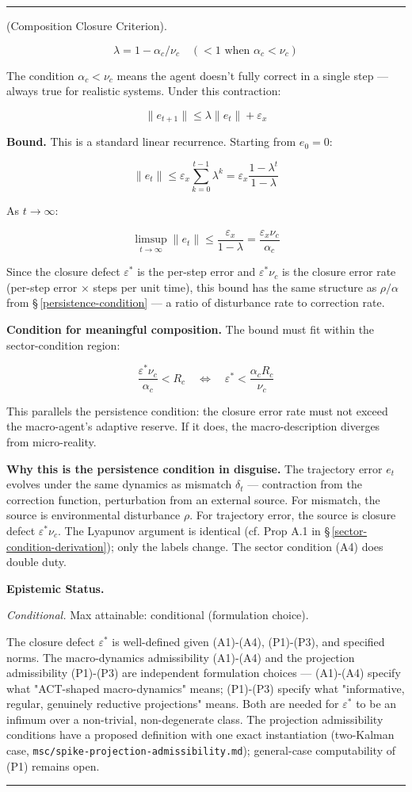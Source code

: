 \documentclass[11pt,oneside]{article}
\newcounter{claim}[section]
\renewcommand{\theclaim}{\thesection.\arabic{claim}}
\newenvironment{segment}[2]{%
  \refstepcounter{claim}%
  \bigskip\noindent\hrule\smallskip
  \noindent{\bfseries #1~\theclaim}\enskip(#2).\par\smallskip
  \noindent\ignorespaces
}{%
  \par\smallskip\noindent\hrule\bigskip
}
\newenvironment{formulation}[1][]{\begin{segment}{Formulation}{#1}}{\end{segment}}
\begin{document}
\begin{formulation}[Composition Closure Criterion]
$$\lambda = 1 - \alpha_c / \nu_c \quad (< 1 \text{ when } \alpha_c < \nu_c)$$

The condition $\alpha_c < \nu_c$ means the agent doesn't fully correct in a single step — always true for realistic systems. Under this contraction:

$$\lVert e_{t+1} \rVert \leq \lambda \lVert e_t \rVert + \varepsilon_x$$

\textbf{Bound.} This is a standard linear recurrence. Starting from $e_0 = 0$:

$$\lVert e_t \rVert \leq \varepsilon_x \sum_{k=0}^{t-1} \lambda^k = \varepsilon_x \frac{1 - \lambda^t}{1 - \lambda}$$

As $t \to \infty$:

$$\limsup_{t \to \infty} \lVert e_t \rVert \leq \frac{\varepsilon_x}{1 - \lambda} = \frac{\varepsilon_x \nu_c}{\alpha_c}$$

Since the closure defect $\varepsilon^*$ is the per-step error and $\varepsilon^* \nu_c$ is the closure error rate (per-step error × steps per unit time), this bound has the same structure as $\rho / \alpha$ from \S\,\ref{persistence-condition} — a ratio of disturbance rate to correction rate.

\textbf{Condition for meaningful composition.} The bound must fit within the sector-condition region:

$$\frac{\varepsilon^* \nu_c}{\alpha_c} < R_c \quad \Longleftrightarrow \quad \varepsilon^* < \frac{\alpha_c R_c}{\nu_c}$$

This parallels the persistence condition: the closure error rate must not exceed the macro-agent's adaptive reserve. If it does, the macro-description diverges from micro-reality.

\textbf{Why this is the persistence condition in disguise.} The trajectory error $e_t$ evolves under the same dynamics as mismatch $\delta_t$ — contraction from the correction function, perturbation from an external source. For mismatch, the source is environmental disturbance $\rho$. For trajectory error, the source is closure defect $\varepsilon^* \nu_c$. The Lyapunov argument is identical (cf. Prop A.1 in \S\,\ref{sector-condition-derivation}); only the labels change. The sector condition (A4) does double duty.


\medskip\noindent\textbf{Epistemic Status.}


\textit{Conditional.} Max attainable: conditional (formulation choice).

The closure defect $\varepsilon^*$ is well-defined given (A1)-(A4), (P1)-(P3), and specified norms. The macro-dynamics admissibility (A1)-(A4) and the projection admissibility (P1)-(P3) are independent formulation choices — (A1)-(A4) specify what "ACT-shaped macro-dynamics" means; (P1)-(P3) specify what "informative, regular, genuinely reductive projections" means. Both are needed for $\varepsilon^*$ to be an infimum over a non-trivial, non-degenerate class. The projection admissibility conditions have a proposed definition with one exact instantiation (two-Kalman case, \texttt{msc/spike-projection-admissibility.md}); general-case computability of (P1) remains open.


\end{formulation}
\end{document}
